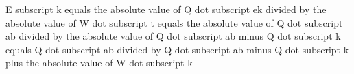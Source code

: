 E subscript k equals the absolute value of Q dot subscript ek divided by the absolute value of W dot subscript t equals the absolute value of Q dot subscript ab divided by the absolute value of Q dot subscript ab minus Q dot subscript k equals Q dot subscript ab divided by Q dot subscript ab minus Q dot subscript k plus the absolute value of W dot subscript k